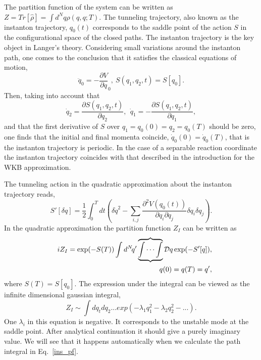 \documentclass[journal=jpcafh,manuscript=article]{achemso}
\begin{document}
The partition function of the system can be written as
$Z=Tr[\hat{\rho}]=\int d^N\! q\rho(q,q;T)$.  The tunneling trajectory,
also known as the instanton trajectory, $q_0(t)$ corresponds to the
saddle point of the action $S$ in the configurational space of the
closed paths.  The instanton trajectory is the key object in Langer's
theory. Considering small variations around the instanton path, one
comes to the conclusion that it satisfies the classical equations of
motion,
\begin{equation}
  \label{ins_em}
  \ddot{q}_0 =-\frac{\partial V}{\partial q}_0,\  S(q_1,q_2,t)=S[q_0].
\end{equation}
Then, taking into account that
\begin{equation}
  \label{act_rel}
  \dot{q}_2=\frac{\partial S(q_1,q_2, t)}{\partial q_2},\ \
  \dot{q}_1 = -\frac{\partial  S(q_1, q_2, t)}{\partial q_1},
\end{equation}
and that the first derivative of $S$ over $q_1=q_0(0)=q_2=q_0(T)$ should be zero,
one finds that the initial and final momenta coincide,
$\dot{q}_0(0)=\dot{q}_0(T)$, that is the instanton trajectory is
periodic. In the case of a separable reaction coordinate the
instanton trajectory coincides with that described in the introduction for the
WKB approximation.

The tunneling action in the quadratic approximation about the
instanton trajectory reads,
\begin{equation}
  \label{ins_act}
  S'[\delta q] = \frac{1}{2}\int_0^T dt (\delta \dot{q}^2 -
  \sum_{i,j}\frac{\partial^2V(q_0(t))}{\partial q_i\partial
    q_j}\delta q_i \delta q_j).
\end{equation}
In the quadratic approximation the partition function $Z_{I}$ can be
written as
\begin{eqnarray}
  \label{ins_pf}
  &&iZ_{I} = \exp(-S(T))\int d^N\! q'\overbrace{\underbrace{\int\cdots\int}}\mathcal{D} q \exp(-S'[q]),
  \\
  \nonumber
  &&q(0)=q(T)=q',
\end{eqnarray}
where $S(T)=S[q_0]$. The expression under the integral can be
viewed as the infinite dimensional gaussian integral,
\begin{equation}
  \label{gauss}
  Z_{I}\sim\int dq_tdq_2...exp(-\lambda_1q_1^2  -\lambda_2q_2^2 - ...).
\end{equation}
One $\lambda_i$ in this equation is negative. It corresponds to
the unstable mode at the saddle point. After analytical continuation
it should give a purely imaginary value. We will see that it happens
automatically when we calculate the path integral in
Eq.~\ref{ins_pf}.
\end{document}
